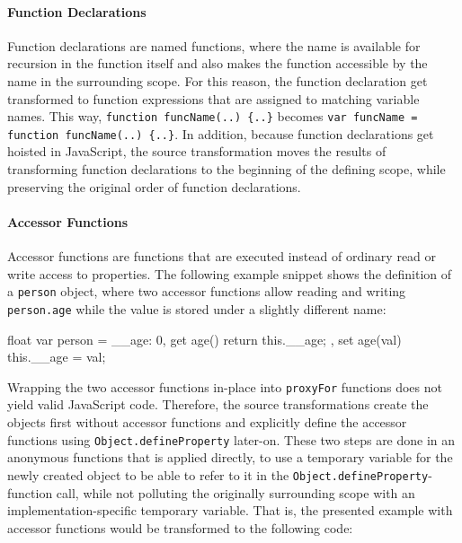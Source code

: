 \paragraph{Function Declarations}
Function declarations are named functions, where the name is available for recursion in the function itself and also makes the function accessible by the name in the surrounding scope.
For this reason, the function declaration get transformed to function expressions that are assigned to matching variable names.
This way, \lstinline|function funcName(..) {..}| becomes \lstinline|var funcName = function funcName(..) {..}|.
In addition, because function declarations get hoisted in JavaScript, the source transformation moves the results of transforming function declarations to the beginning of the defining scope, while preserving the original order of function declarations.

\paragraph{Accessor Functions}
Accessor functions are functions that are executed instead of ordinary read or write access to properties.
The following example snippet shows the definition of a \lstinline{person} object, where two accessor functions allow reading and writing \lstinline{person.age} while the value is stored under a slightly different name:

\begin{code}{}{float}
var person = {
    __age: 0,
    get age() {
        return this.__age;
    },
    set age(val) {
        this.__age = val;
    }
}
\end{code}
\iffalse
\end{verbatim}\fi

Wrapping the two accessor functions in-place into \lstinline{proxyFor} functions does not yield valid JavaScript code.
Therefore, the source transformations create the objects first without accessor functions and explicitly define the accessor functions using \lstinline{Object.defineProperty} later-on.
These two steps are done in an anonymous functions that is applied directly, to use a temporary variable for the newly created object to be able to refer to it in the \lstinline{Object.defineProperty}-function call, while not polluting the originally surrounding scope with an implementation-specific temporary variable.
That is, the presented example with accessor functions would be transformed to the following code: \\

